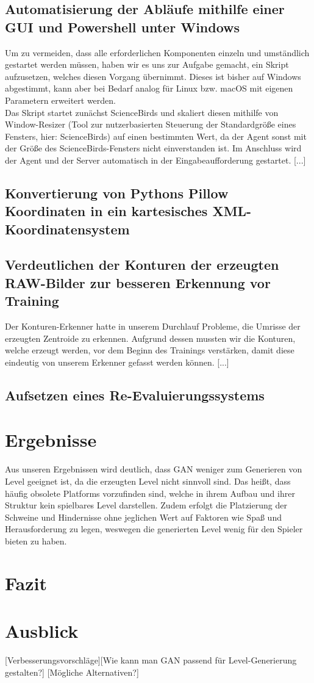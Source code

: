 \documentclass[11pt]{article}
\begin{document}
\subsection{Automatisierung der Abläufe mithilfe einer GUI und Powershell unter Windows}
Um zu vermeiden, dass alle erforderlichen Komponenten einzeln und umständlich gestartet werden müssen, haben wir es uns zur Aufgabe gemacht, ein Skript aufzusetzen, welches diesen Vorgang übernimmt. Dieses ist bisher auf Windows abgestimmt, kann aber bei Bedarf analog für Linux bzw. macOS mit eigenen Parametern erweitert werden.\\Das Skript startet zunächst ScienceBirds und skaliert diesen mithilfe von Window-Resizer (Tool zur nutzerbasierten Steuerung der Standardgröße eines Fensters, hier: ScienceBirds) auf einen bestimmten Wert, da der Agent sonst mit der Größe des ScienceBirds-Fensters nicht einverstanden ist. Im Anschluss wird der Agent und der Server automatisch in der Eingabeaufforderung gestartet. [...]
\subsection{Konvertierung von Pythons Pillow Koordinaten in ein kartesisches XML-Koordinatensystem}
\subsection{Verdeutlichen der Konturen der erzeugten RAW-Bilder zur besseren Erkennung vor Training}
Der Konturen-Erkenner hatte in unserem Durchlauf Probleme, die Umrisse der erzeugten Zentroide zu erkennen. Aufgrund dessen mussten wir die Konturen, welche erzeugt werden, vor dem Beginn des Trainings verstärken, damit diese eindeutig von unserem Erkenner gefasst werden können. [...]
\subsection{Aufsetzen eines Re-Evaluierungssystems}
\section{Ergebnisse}
Aus unseren Ergebnissen wird deutlich, dass GAN weniger zum Generieren von Level geeignet ist, da die erzeugten Level nicht sinnvoll sind. Das heißt, dass häufig obsolete Platforms vorzufinden sind, welche in ihrem Aufbau und ihrer Struktur kein spielbares Level darstellen. Zudem erfolgt die Platzierung der Schweine und Hindernisse ohne jeglichen Wert auf Faktoren wie Spaß und Herausforderung zu legen, weswegen die generierten Level wenig für den Spieler bieten zu haben. 
\section{Fazit}

\section{Ausblick}
[Verbesserungsvorschläge][Wie kann man GAN passend für Level-Generierung gestalten?] [Mögliche Alternativen?]
\end{document}
